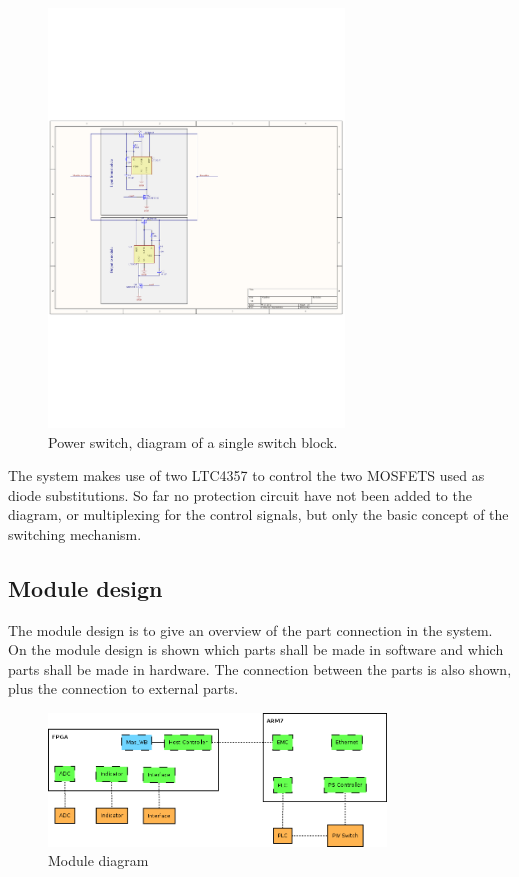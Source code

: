 \begin{figure}[H]
	\begin{centering}
		\includegraphics[width=0.7\textwidth,page=1,angle=0]{content/appendix/eudp/images/PS_initial_drawing.pdf}
		\caption{Power switch, diagram of a single switch block.}
		\label{fig:ps_switch_dia_v0_1}
	\end{centering}
\end{figure}
The system makes use of two LTC4357 to control the two MOSFETS used as diode substitutions. So far no protection circuit have not been added to the diagram, or multiplexing for the control signals, but only the basic concept of the switching mechanism.

\subsection{Module design}

The module design is to give an overview of the part connection in the system. On the module design is shown which parts shall be made in software and which parts shall be made in hardware. The connection between the parts is also shown, plus the connection to external parts.

\begin{figure}[H]
	\begin{centering}
		\includegraphics[width=0.8\textwidth,page=1,angle=0]{content/appendix/eudp/images/module_design.png}
		\caption{Module diagram}
		\label{fig:module_design_diagram}
	\end{centering}
\end{figure}

